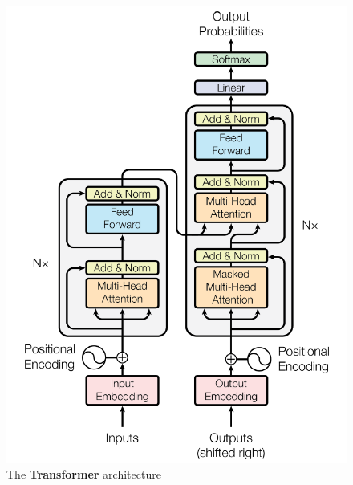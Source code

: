 \begin{figure}
    \centering
    \includegraphics[scale=0.8]{img/transformer_archs.png}
    \caption{The \textbf{Transformer} architecture}
    \label{fig:transformer_arch}
\end{figure}

